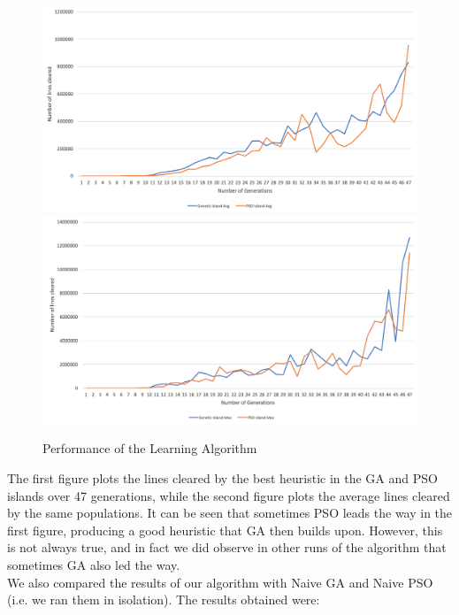 \documentclass[12pt]{article}
\begin{document}
	\begin{figure}[h]
		\includegraphics[scale=0.28]{learning/AlgoMax}
		\includegraphics[scale=0.28]{learning/AlgoAvg}
		\centering
		\caption{Performance of the Learning Algorithm}
		\label{fig:learning}
	\end{figure}

	The first figure plots the lines cleared by the best heuristic in
	the GA and PSO islands over 47 generations, while the second figure plots
	the average lines cleared by the same populations. It can be seen that sometimes PSO leads the
	way in the first figure, producing a good heuristic that GA then builds
	upon. However, this is not always true, and in fact we did observe in other
	runs of the algorithm that sometimes GA also led the way.\\
	We also compared the results of our algorithm with Naive GA and Naive PSO
	(i.e. we ran them in isolation). The results obtained were:
\end{document}
